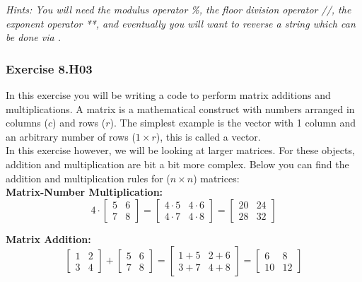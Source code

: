 \textit{Hints:
You will need the modulus operator \%, the floor division operator //, the exponent operator **, and eventually you will want to reverse a string which can be done via {}.}\\[1cm]



\subsubsection*{Exercise 8.H03 \red{[M]}}
In this exercise you will be writing a code to perform matrix additions and multiplications.
A matrix is a mathematical construct with numbers arranged in columns ($c$) and rows ($r$). The simplest example is the vector with 1 column and an arbitrary number of rows ($1 \times r$), this is called a vector.\\
In this exercise however, we will be looking at larger matrices. For these objects, addition
and multiplication are bit a bit more complex. Below you can find the addition and
multiplication rules for ($n \times n$) matrices:\\


\textbf{Matrix-Number Multiplication:}
\[
4 \cdot
  \begin{bmatrix}
    5 & 6\\
    7 & 8
  \end{bmatrix} = 
  \begin{bmatrix}
    4 \cdot 5 & 4 \cdot 6\\
    4 \cdot 7 & 4 \cdot 8
  \end{bmatrix} =
  \begin{bmatrix}
    20 & 24\\
    28 & 32
  \end{bmatrix}
\]

\textbf{Matrix Addition:}
\[
  \begin{bmatrix}
    1 & 2\\
    3 & 4
  \end{bmatrix} +
  \begin{bmatrix}
    5 & 6\\
    7 & 8
  \end{bmatrix} =
  \begin{bmatrix}
    1+5 & 2+6\\
    3+7 & 4+8
  \end{bmatrix} =
  \begin{bmatrix}
    6 & 8\\
    10 & 12
  \end{bmatrix}
\]

